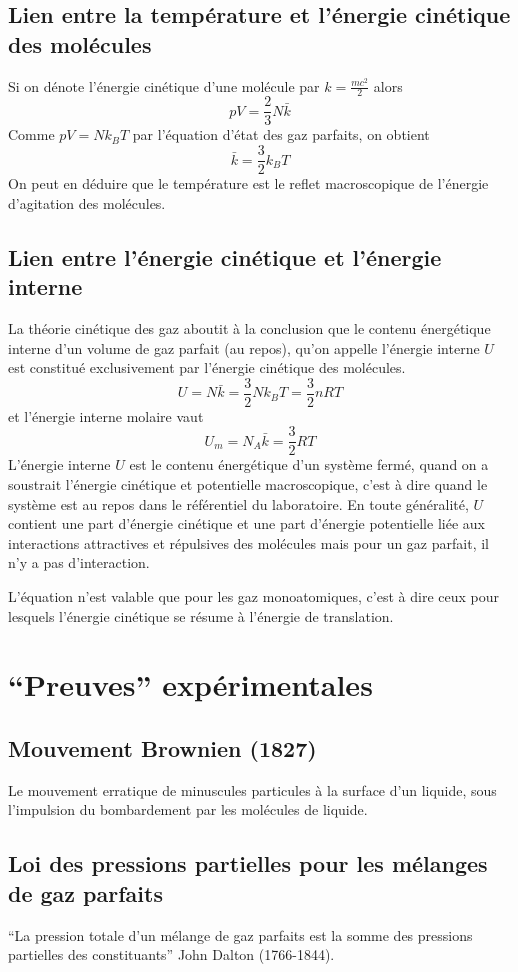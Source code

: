 \subsection{Lien entre la température et l'énergie cinétique des molécules}
Si on dénote l'énergie cinétique d'une molécule par $k = \frac{mc^2}{2}$ alors
\[ pV = \frac 23 N\bar k \]
Comme $pV = Nk_BT$ par l'équation d'état des gaz parfaits, on obtient
\[ \bar k = \frac 32 k_B T \]
On peut en déduire que le température est
le reflet macroscopique de l'énergie d'agitation des molécules.

\subsection{Lien entre l'énergie cinétique et l'énergie interne}
La théorie cinétique des gaz aboutit à la conclusion que
le contenu énergétique interne d'un volume de gaz parfait (au repos),
qu'on appelle l'énergie interne $U$ est constitué exclusivement
par l'énergie cinétique des molécules.
\[ U = N\bar k = \frac 32 Nk_BT = \frac 32nRT \]
et l'énergie interne molaire vaut
\[ U_m = N_A\bar k = \frac 32 RT \]
L'énergie interne $U$ est le contenu énergétique d'un système fermé,
quand on a soustrait l'énergie cinétique et potentielle macroscopique,
c'est à dire quand le système est au repos dans le référentiel du laboratoire.
En toute généralité, $U$ contient une part d'énergie cinétique et
une part d'énergie potentielle liée aux interactions attractives et
répulsives des molécules mais pour un gaz parfait, il n'y a pas d'interaction.

L'équation n'est valable que pour les gaz monoatomiques,
c'est à dire ceux pour lesquels l'énergie cinétique se résume à
l'énergie de translation.

\section{``Preuves'' expérimentales}
\subsection{Mouvement Brownien (1827)}
Le mouvement erratique de minuscules particules à la surface d'un liquide,
sous l'impulsion du bombardement par les molécules de liquide.

\subsection{Loi des pressions partielles pour les mélanges de gaz parfaits}
``La pression totale d'un mélange de gaz parfaits est
la somme des pressions partielles des constituants'' John Dalton (1766-1844).

